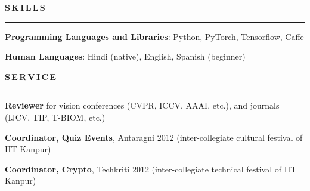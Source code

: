 \documentclass[11pt, a4paper]{article}
\begin{document}
\vspace{-4pt}
%
%

\textbf{S\,K\,I\,L\,L\,S}
\vspace{5pt}
\hrule
\vspace{7pt}
\textbf{Programming Languages and Libraries}: Python, PyTorch, Tensorflow, Caffe

\textbf{Human Languages}: Hindi (native), English, Spanish (beginner)

\vspace{8pt}

\textbf{S\,E\,R\,V\,I\,C\,E}
\vspace{5pt}
\hrule
\vspace{7pt}
\textbf{Reviewer} for vision conferences (CVPR, ICCV, AAAI, etc.), and journals (IJCV, TIP,
T-BIOM, etc.)

\vspace{2pt}

\textbf{Coordinator, Quiz Events}, Antaragni 2012 (inter-collegiate cultural festival of IIT Kanpur)

\vspace{2pt}

\textbf{Coordinator, Crypto}, Techkriti 2012 (inter-collegiate technical festival of IIT Kanpur)
\end{document}
